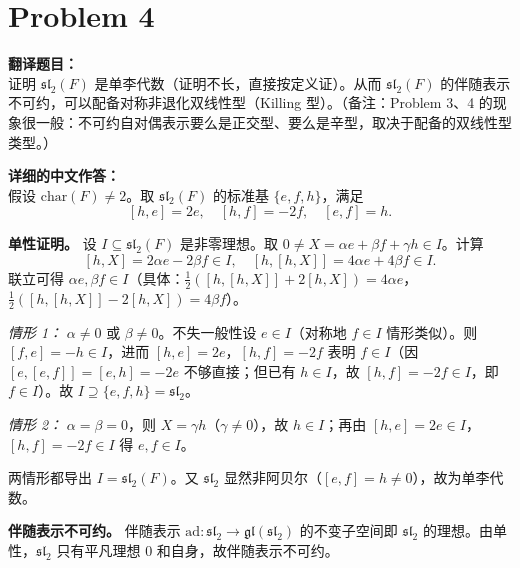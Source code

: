 \documentclass{ctexart}
\begin{document}
\vspace{2em}
\section*{Problem 4}
\textbf{翻译题目：}\\
证明 $\mathfrak{sl}_2(F)$ 是单李代数（证明不长，直接按定义证）。从而 $\mathfrak{sl}_2(F)$ 的伴随表示不可约，可以配备对称非退化双线性型（Killing 型）。（备注：Problem 3、4 的现象很一般：不可约自对偶表示要么是正交型、要么是辛型，取决于配备的双线性型类型。）

\vspace{1em}
\textbf{详细的中文作答：}\\
假设 $\mathrm{char}(F) \neq 2$。取 $\mathfrak{sl}_2(F)$ 的标准基 $\{e, f, h\}$，满足
\[
[h, e] = 2e, \quad [h, f] = -2f, \quad [e, f] = h.
\]

\textbf{单性证明。} 设 $I \subseteq \mathfrak{sl}_2(F)$ 是非零理想。取 $0 \neq X = \alpha e + \beta f + \gamma h \in I$。计算
\[
[h, X] = 2\alpha e - 2\beta f \in I, \quad [h, [h, X]] = 4\alpha e + 4\beta f \in I.
\]
联立可得 $\alpha e, \beta f \in I$（具体：$\tfrac{1}{2}([h,[h,X]]+2[h,X]) = 4\alpha e$，$\tfrac{1}{2}([h,[h,X]]-2[h,X]) = 4\beta f$）。

\emph{情形 1：} $\alpha \neq 0$ 或 $\beta \neq 0$。不失一般性设 $e \in I$（对称地 $f \in I$ 情形类似）。则 $[f, e] = -h \in I$，进而 $[h, e] = 2e$，$[h, f] = -2f$ 表明 $f \in I$（因 $[e, [e, f]] = [e, h] = -2e$ 不够直接；但已有 $h \in I$，故 $[h, f] = -2f \in I$，即 $f \in I$）。故 $I \supseteq \{e, f, h\} = \mathfrak{sl}_2$。

\emph{情形 2：} $\alpha = \beta = 0$，则 $X = \gamma h$（$\gamma \neq 0$），故 $h \in I$；再由 $[h, e] = 2e \in I$，$[h, f] = -2f \in I$ 得 $e, f \in I$。

两情形都导出 $I = \mathfrak{sl}_2(F)$。又 $\mathfrak{sl}_2$ 显然非阿贝尔（$[e,f]=h \neq 0$），故为单李代数。

\textbf{伴随表示不可约。} 伴随表示 $\mathrm{ad}: \mathfrak{sl}_2 \to \mathfrak{gl}(\mathfrak{sl}_2)$ 的不变子空间即 $\mathfrak{sl}_2$ 的理想。由单性，$\mathfrak{sl}_2$ 只有平凡理想 $0$ 和自身，故伴随表示不可约。
\end{document}

